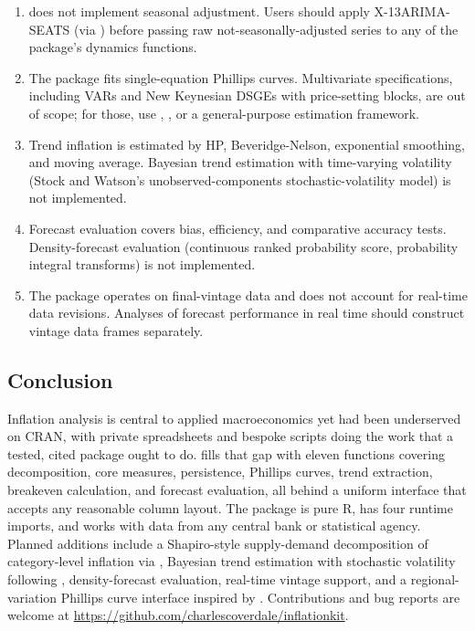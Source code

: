 \begin{enumerate}
\def\labelenumi{\arabic{enumi}.}
\tightlist
\item
   does not implement seasonal adjustment. Users
  should apply X-13ARIMA-SEATS (via ) before passing
  raw not-seasonally-adjusted series to any of the package's dynamics
  functions.
\item
  The package fits single-equation Phillips curves. Multivariate
  specifications, including VARs and New Keynesian DSGEs with
  price-setting blocks, are out of scope; for those, use ,
  , or a general-purpose estimation framework.
\item
  Trend inflation is estimated by HP, Beveridge-Nelson, exponential
  smoothing, and moving average. Bayesian trend estimation with
  time-varying volatility (Stock and Watson's unobserved-components
  stochastic-volatility model) is not implemented.
\item
  Forecast evaluation covers bias, efficiency, and comparative accuracy
  tests. Density-forecast evaluation (continuous ranked probability
  score, probability integral transforms) is not implemented.
\item
  The package operates on final-vintage data and does not account for
  real-time data revisions. Analyses of forecast performance in real
  time should construct vintage data frames separately.
\end{enumerate}

\FloatBarrier

\subsection{Conclusion}\label{conclusion}

Inflation analysis is central to applied macroeconomics yet had been
underserved on CRAN, with private spreadsheets and bespoke scripts doing
the work that a tested, cited package ought to do.
 fills that gap with eleven functions covering
decomposition, core measures, persistence, Phillips curves, trend
extraction, breakeven calculation, and forecast evaluation, all behind a
uniform interface that accepts any reasonable column layout. The package
is pure R, has four runtime imports, and works with data from any
central bank or statistical agency. Planned additions include a
Shapiro-style supply-demand decomposition of category-level inflation
via , Bayesian trend estimation with
stochastic volatility following \citet{stock2007why}, density-forecast
evaluation, real-time vintage support, and a regional-variation Phillips
curve interface inspired by \citet{hazell2022slope}. Contributions and
bug reports are welcome at
\url{https://github.com/charlescoverdale/inflationkit}.



\address{%
Charles Coverdale\\
London, United Kingdom\\%
United Kingdom\\
%
\url{https://github.com/charlescoverdale/inflationkit}\\%
%
\href{mailto:charles.f.coverdale@gmail.com}{\nolinkurl{charles.f.coverdale@gmail.com}}%
}
